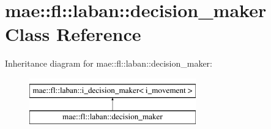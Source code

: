 \hypertarget{classmae_1_1fl_1_1laban_1_1decision__maker}{\section{mae\-:\-:fl\-:\-:laban\-:\-:decision\-\_\-maker Class Reference}
\label{classmae_1_1fl_1_1laban_1_1decision__maker}
}
Inheritance diagram for mae\-:\-:fl\-:\-:laban\-:\-:decision\-\_\-maker\-:\begin{figure}[H]
\begin{center}
\leavevmode
\includegraphics[height=2.000000cm]{classmae_1_1fl_1_1laban_1_1decision__maker}
\end{center}
\end{figure}
